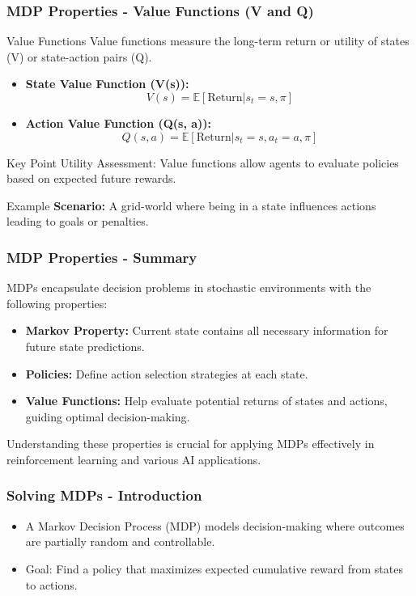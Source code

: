 \documentclass[aspectratio=169]{beamer}
\begin{document}
\begin{frame}[fragile]
    \frametitle{MDP Properties - Value Functions (V and Q)}
    \begin{block}{Value Functions}
        Value functions measure the long-term return or utility of states (V) or state-action pairs (Q).
    \end{block}
    \begin{itemize}
        \item \textbf{State Value Function (V(s)):}
        \[
        V(s) = \mathbb{E}[\text{Return} | s_t = s, \pi]
        \]
        
        \item \textbf{Action Value Function (Q(s, a)):}
        \[
        Q(s, a) = \mathbb{E}[\text{Return} | s_t = s, a_t = a, \pi]
        \]
    \end{itemize}
    \begin{block}{Key Point}
        Utility Assessment: Value functions allow agents to evaluate policies based on expected future rewards.
    \end{block}
    \begin{block}{Example}
        \textbf{Scenario:} A grid-world where being in a state influences actions leading to goals or penalties.
    \end{block}
\end{frame}

\begin{frame}[fragile]
    \frametitle{MDP Properties - Summary}
    MDPs encapsulate decision problems in stochastic environments with the following properties:
    \begin{itemize}
        \item \textbf{Markov Property:} Current state contains all necessary information for future state predictions.
        \item \textbf{Policies:} Define action selection strategies at each state.
        \item \textbf{Value Functions:} Help evaluate potential returns of states and actions, guiding optimal decision-making.
    \end{itemize}
    Understanding these properties is crucial for applying MDPs effectively in reinforcement learning and various AI applications.
\end{frame}

\begin{frame}[fragile]
  \frametitle{Solving MDPs - Introduction}
  \begin{itemize}
    \item A Markov Decision Process (MDP) models decision-making where outcomes are partially random and controllable.
    \item Goal: Find a policy that maximizes expected cumulative reward from states to actions.
  \end{itemize}
\end{frame}
\end{document}
